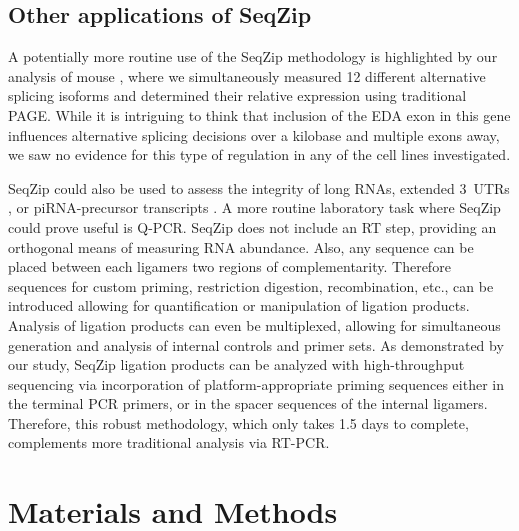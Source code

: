 	\subsection{Other applications of SeqZip}

		A potentially more routine use of the SeqZip methodology is highlighted by our analysis of mouse \fn{}, where we simultaneously measured 12 different alternative splicing isoforms and determined their relative expression using traditional PAGE. While it is intriguing to think that inclusion of the EDA exon in this gene influences alternative splicing decisions over a kilobase and multiple exons away, we saw no evidence for this type of regulation in any of the cell lines investigated.

		SeqZip could also be used to assess the integrity of long RNAs, extended 3\textprime~UTRs \citep{Wang2013b}, or piRNA-precursor transcripts \citep{Li2013h}. A more routine laboratory task where SeqZip could prove useful is Q-PCR. SeqZip does not include an RT step, providing an orthogonal means of measuring RNA abundance. Also, any sequence can be placed between each ligamers two regions of complementarity. Therefore sequences for custom priming, restriction digestion, recombination, etc., can be introduced allowing for quantification or manipulation of ligation products. Analysis of ligation products can even be multiplexed, allowing for simultaneous generation and analysis of internal controls and primer sets. As demonstrated by our \dscam{} study, SeqZip ligation products can be analyzed with high-throughput sequencing via incorporation of platform-appropriate priming sequences either in the terminal PCR primers, or in the spacer sequences of the internal ligamers. Therefore, this robust methodology, which only takes 1.5 days to complete, complements more traditional analysis via RT-PCR. 

\section{Materials and Methods}
	\label{SeqZipPaper:sec: Methods and Materials}


